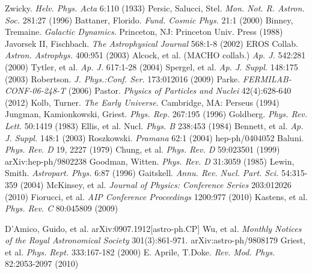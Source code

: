 \documentclass[a4paper,12pt]{article}
\begin{document}
\begin{thebibliography}{1}

 Zwicky.  \emph{Helv. Phys. Acta} 6:110 (1933)
 Persic, Salucci, Stel.  \emph{Mon. Not. R. Astron. Soc.} 281:27 (1996)
 Battaner, Florido.  \emph{Fund. Cosmic Phys.} 21:1 (2000)
 Binney, Tremaine. \emph{Galactic Dynamics}. Princeton, NJ: Princeton Univ. Press (1988)
 Javorsek II, Fischbach. \emph{The Astrophysical Journal} 568:1-8 (2002)
 EROS Collab.  \emph{Astron. Astrophys.} 400:951 (2003)
 Alcock, et al. (MACHO collab.)  \emph{Ap. J.} 542:281 (2000)
 Tytler, et al. \emph{Ap. J.} 617:1-28 (2004)
 Spergel, et al. \emph{Ap. J. Suppl.} 148:175 (2003)
 Robertson. \emph{J. Phys.:Conf. Ser.} 173:012016 (2009)
 Parke.  \emph{FERMILAB-CONF-06-248-T} (2006)
 Pastor.  \emph{Physics of Particles and Nuclei} 42(4):628-640 (2012)
 Kolb, Turner. \emph{The Early Universe}.  Cambridge, MA: Perseus (1994)
 Jungman, Kamionkowski, Griest.  \emph{Phys. Rep.} 267:195 (1996)
 Goldberg.  \emph{Phys. Rev. Lett.} 50:1419 (1983)
 Ellis, et al. Nucl. \emph{Phys. B} 238:453 (1984)
 Bennett, et al. \emph{Ap. J. Suppl.} 148:1 (2003)
 Roszkowski.  \emph{Pramana} 62:1 (2004) hep-ph/0404052
 Baluni. \emph{Phys. Rev. D} 19, 2227 (1979)
 Chung, et al.  \emph{Phys. Rev. D} 59:023501 (1999) arXiv:hep-ph/9802238
 Goodman, Witten. \emph{Phys. Rev. D} 31:3059 (1985)
 Lewin, Smith. \emph{Astropart. Phys.} 6:87 (1996)
 Gaitskell.  \emph{Annu. Rev. Nucl. Part. Sci.} 54:315-359 (2004)
 McKinsey, et al.  \emph{Journal of Physics: Conference Series} 203:012026 (2010) 
 Fiorucci, et al.  \emph{AIP Conference Proceedings} 1200:977 (2010)
 Kastens, et al. \emph{Phys. Rev. C} 80:045809 (2009)

 D'Amico, Guido, et al. arXiv:0907.1912[astro-ph.CP] 
 Wu, et al.  \emph{Monthly Notices of the Royal Astronomical Society} 301(3):861-971.  arXiv:astro-ph/9808179
 Griest, et al.  \emph{Phys. Rept.} 333:167-182 (2000) 
 E. Aprile, T.Doke. \emph{Rev. Mod. Phys.} 82:2053-2097 (2010)



\end{thebibliography}
\end{document}
